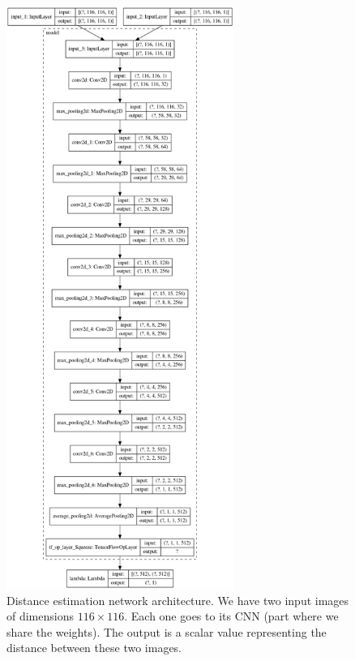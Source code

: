 \begin{figure}[h!]
    \centering
    \includegraphics[height=19cm]{figures/model_plot.png}
    \caption{%
        Distance estimation network architecture.
        We have two input images of dimensions $116 \times 116$.
        Each one goes to its CNN (part where we share the weights).
        The output is a scalar value representing the distance between these two images.
    }\label{fig:de-architecture}
\end{figure}
